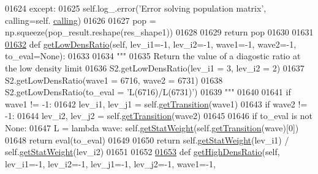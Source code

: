 \begin{DoxyCode}
{{01624                 \textcolor{keywordflow}{except}:
01625                     self.log\_.error(\textcolor{stringliteral}{'Error solving population matrix'}, calling=self.
      \hyperlink{classpyneb_1_1core_1_1pynebcore_1_1_atom_a373b7735acf4f528b54bddf373ad67a1}{calling})
01626             
01627             pop = np.squeeze(pop\_result.reshape(res\_shape1))
01628             
01629         \textcolor{keywordflow}{return} pop
01630 
01631     
\hypertarget{pynebcore_8py_source_l01632}{}\hyperlink{classpyneb_1_1core_1_1pynebcore_1_1_atom_aa6db2a3425e5a35f0bd04f05bcb25ee1}{01632}     \textcolor{keyword}{def }\hyperlink{classpyneb_1_1core_1_1pynebcore_1_1_atom_aa6db2a3425e5a35f0bd04f05bcb25ee1}{getLowDensRatio}(self, lev\_i1=-1, lev\_i2=-1, wave1=-1, wave2=-1, to\_eval=None):
01633         
01634         \textcolor{stringliteral}{"""}
01635 \textcolor{stringliteral}{        Return the value of a diagostic ratio at the low density limit}
01636 \textcolor{stringliteral}{        S2.getLowDensRatio(lev\_i1 = 3, lev\_i2 = 2)}
01637 \textcolor{stringliteral}{        S2.getLowDensRatio(wave1 = 6716, wave2 = 6731)}
01638 \textcolor{stringliteral}{        S2.getLowDensRatio(to\_eval = 'L(6716)/L(6731)')}
01639 \textcolor{stringliteral}{        """}
01640         
01641         \textcolor{keywordflow}{if} wave1 != -1:
01642             lev\_i1, lev\_j1 = self.\hyperlink{classpyneb_1_1core_1_1pynebcore_1_1_atom_a7c9f17a3d9e841267add92377d9d1ede}{getTransition}(wave1)
01643         \textcolor{keywordflow}{if} wave2 != -1:
01644             lev\_i2, lev\_j2 = self.\hyperlink{classpyneb_1_1core_1_1pynebcore_1_1_atom_a7c9f17a3d9e841267add92377d9d1ede}{getTransition}(wave2)
01645             
01646         \textcolor{keywordflow}{if} to\_eval \textcolor{keywordflow}{is} \textcolor{keywordflow}{not} \textcolor{keywordtype}{None}:
01647             L = \textcolor{keyword}{lambda} wave: self.\hyperlink{classpyneb_1_1core_1_1pynebcore_1_1_atom_a0f2483487115f19556586b9e422bd5fb}{getStatWeight}(self.\hyperlink{classpyneb_1_1core_1_1pynebcore_1_1_atom_a7c9f17a3d9e841267add92377d9d1ede}{getTransition}(wave)[0])
01648             \textcolor{keywordflow}{return} eval(to\_eval)
01649             
01650         \textcolor{keywordflow}{return} self.\hyperlink{classpyneb_1_1core_1_1pynebcore_1_1_atom_a0f2483487115f19556586b9e422bd5fb}{getStatWeight}(lev\_i1) / self.\hyperlink{classpyneb_1_1core_1_1pynebcore_1_1_atom_a0f2483487115f19556586b9e422bd5fb}{getStatWeight}(lev\_i2)
01651         
01652         
\hypertarget{pynebcore_8py_source_l01653}{}\hyperlink{classpyneb_1_1core_1_1pynebcore_1_1_atom_ac2e1509a2acc642c00696f3787e95f95}{01653}     \textcolor{keyword}{def }\hyperlink{classpyneb_1_1core_1_1pynebcore_1_1_atom_ac2e1509a2acc642c00696f3787e95f95}{getHighDensRatio}(self, lev\_i1=-1, lev\_i2=-1, lev\_j1=-1, lev\_j2=-1, wave1=-1, 
}}
\end{DoxyCode}
